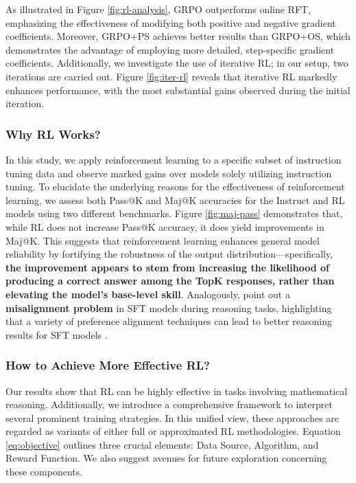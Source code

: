 \begin{itemize}[topsep=0pt]
\begin{itemize}[topsep=0pt]
As illustrated in Figure \ref{fig:rl-analysis}, GRPO outperforms online RFT, emphasizing the effectiveness of modifying both positive and negative gradient coefficients. Moreover, GRPO+PS achieves better results than GRPO+OS, which demonstrates the advantage of employing more detailed, step-specific gradient coefficients. Additionally, we investigate the use of iterative RL; in our setup, two iterations are carried out. Figure \ref{fig:iter-rl} reveals that iterative RL markedly enhances performance, with the most substantial gains observed during the initial iteration.

\subsubsection{Why RL Works?} In this study, we apply reinforcement learning to a specific subset of instruction tuning data and observe marked gains over models solely utilizing instruction tuning. To elucidate the underlying reasons for the effectiveness of reinforcement learning, we assess both Pass@K and Maj@K accuracies for the Instruct and RL models using two different benchmarks. Figure \ref{fig:maj-pass} demonstrates that, while RL does not increase Pass@K accuracy, it does yield improvements in Maj@K. This suggests that reinforcement learning enhances general model reliability by fortifying the robustness of the output distribution—specifically, \textbf{the improvement appears to stem from increasing the likelihood of producing a correct answer among the TopK responses, rather than elevating the model’s base-level skill}. Analogously, \citep{wang2023making} point out a \textbf{misalignment problem} in SFT models during reasoning tasks, highlighting that a variety of preference alignment techniques can lead to better reasoning results for SFT models \citep{yuan2023rrhf,song2023preference,wang2023making}.

\subsubsection{How to Achieve More Effective RL?}
\label{sec:effec_rl}
Our results show that RL can be highly effective in tasks involving mathematical reasoning. Additionally, we introduce a comprehensive framework to interpret several prominent training strategies. In this unified view, these approaches are regarded as variants of either full or approximated RL methodologies. Equation \ref{eq:objective} outlines three crucial elements: Data Source, Algorithm, and Reward Function. We also suggest avenues for future exploration concerning these components.


\end{itemize}
\end{itemize}
